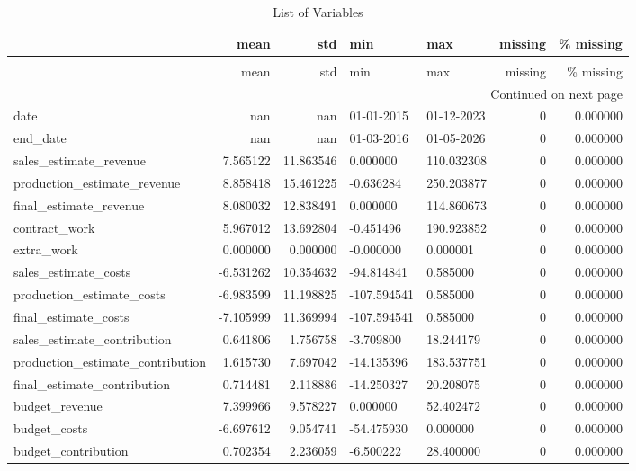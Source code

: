 \begin{landscape}\begin{longtable}[h!]{lrrllrr}
\caption{List of Variables} \label{eda_1} \\
\toprule
 & mean & std & min & max & missing & \% missing \\
\midrule
\endfirsthead
\caption[]{List of Variables} \\
\toprule
 & mean & std & min & max & missing & \% missing \\
\midrule
\endhead
\midrule
\multicolumn{7}{r}{Continued on next page} \\
\midrule
\endfoot
\bottomrule
\endlastfoot
date & nan & nan & 01-01-2015 & 01-12-2023 & 0 & 0.000000 \\
end_date & nan & nan & 01-03-2016 & 01-05-2026 & 0 & 0.000000 \\
sales_estimate_revenue & 7.565122 & 11.863546 & 0.000000 & 110.032308 & 0 & 0.000000 \\
production_estimate_revenue & 8.858418 & 15.461225 & -0.636284 & 250.203877 & 0 & 0.000000 \\
final_estimate_revenue & 8.080032 & 12.838491 & 0.000000 & 114.860673 & 0 & 0.000000 \\
contract_work & 5.967012 & 13.692804 & -0.451496 & 190.923852 & 0 & 0.000000 \\
extra_work & 0.000000 & 0.000000 & -0.000000 & 0.000001 & 0 & 0.000000 \\
sales_estimate_costs & -6.531262 & 10.354632 & -94.814841 & 0.585000 & 0 & 0.000000 \\
production_estimate_costs & -6.983599 & 11.198825 & -107.594541 & 0.585000 & 0 & 0.000000 \\
final_estimate_costs & -7.105999 & 11.369994 & -107.594541 & 0.585000 & 0 & 0.000000 \\
sales_estimate_contribution & 0.641806 & 1.756758 & -3.709800 & 18.244179 & 0 & 0.000000 \\
production_estimate_contribution & 1.615730 & 7.697042 & -14.135396 & 183.537751 & 0 & 0.000000 \\
final_estimate_contribution & 0.714481 & 2.118886 & -14.250327 & 20.208075 & 0 & 0.000000 \\
budget_revenue & 7.399966 & 9.578227 & 0.000000 & 52.402472 & 0 & 0.000000 \\
budget_costs & -6.697612 & 9.054741 & -54.475930 & 0.000000 & 0 & 0.000000 \\
budget_contribution & 0.702354 & 2.236059 & -6.500222 & 28.400000 & 0 & 0.000000 \\

\end{longtable}
\end{landscape}
